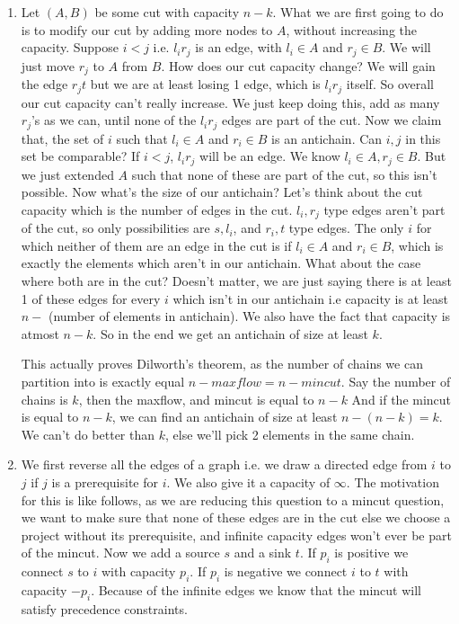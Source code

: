 \documentclass[12pt]{report}
\begin{document}
\begin{enumerate}[label=\textbf{\arabic*.}]
  \item Let $(A,B)$ be some cut with capacity $n-k$. What we are first going to do is to modify our cut by adding more nodes to $A$, without increasing the 
  capacity. Suppose $i < j$ i.e. $l_i r_j$ is an edge, with $l_i \in A$ and $r_j \in B$. We will just move $r_j$ to $A$ from $B$. How does our cut capacity 
  change? We will gain the edge $r_j t$ but we are at least losing 1 edge, which is $l_i r_j$ itself. So overall our cut capacity can't really increase.
  We just keep doing this, add as many $r_j$'s as we can, until none of the $l_i r_j$ edges are part of the cut. Now we claim that, the set of $i$ such that
  $l_i \in A$ and $r_i \in B$ is an antichain. Can $i,j$ in this set be comparable? If $i<j$, $l_i r_j$ will be an edge. 
  We know $l_i \in A, r_j \in B$. But we just extended $A$ such that none of these are part of the cut, so this isn't possible. Now what's the size of our
  antichain? Let's think about the cut capacity which is the number of edges in the cut. $l_i, r_j$ type edges aren't part of the cut, so only possibilities
  are $s, l_i$, and $r_i, t$ type edges. The only $i$ for which neither of them are an edge in the cut is if $l_i \in A$ and $r_i \in B$, which is exactly
  the elements which aren't in our antichain. What about the case where both are in the cut? Doesn't matter, we are just saying there is at least 1 of these 
  edges for every $i$ which isn't in our antichain i.e capacity is at least $n -$ (number of elements in antichain). We also have the fact that capacity is 
  atmost $n-k$. So in the end we get an antichain of size at least $k$.

  This actually proves Dilworth's theorem, as the number of chains we can partition into is exactly equal $n - maxflow = n - mincut$. 
  Say the number of chains is $k$, then the maxflow, and mincut is equal to $n-k$
  And if the mincut is equal to $n-k$, we can find an antichain of size at least $n - (n-k) = k$. We can't do better than $k$, else we'll pick 2 elements in
  the same chain.

  \item We first reverse all the edges of a graph i.e. we draw a directed edge from $i$ to $j$ if $j$ is a prerequisite for $i$. We also give it a capacity 
  of $\infty$. The motivation for this is like follows, as we are reducing this question to a mincut question, we want to make sure that none of these edges 
  are in the cut else we choose a project without its prerequisite, and infinite capacity edges won't ever be part of the mincut. Now we add a source $s$ and
  a sink $t$. If $p_i$ is positive we connect $s$ to $i$ with capacity $p_i$. If $p_i$ is negative we connect $i$ to $t$ with capacity $-p_i$. Because of 
  the infinite edges we know that the mincut will satisfy precedence constraints. 


\end{enumerate}
\end{document}
